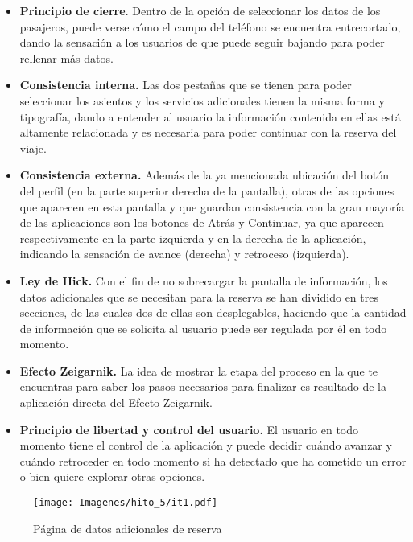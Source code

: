\begin{itemize}
    \item \textbf{Principio de cierre}. Dentro de la opción de seleccionar los datos de los pasajeros, puede verse
        cómo el campo del teléfono se encuentra entrecortado, dando la sensación a los usuarios de que puede seguir
        bajando para poder rellenar más datos.
    \item \textbf{Consistencia interna.} Las dos pestañas que se tienen para poder seleccionar los asientos y los servicios
        adicionales tienen la misma forma y tipografía, dando a entender al usuario la información contenida en
        ellas está altamente relacionada y es necesaria para poder continuar con la reserva del viaje.
    \item \textbf{Consistencia externa.} Además de la ya mencionada ubicación del botón del perfil (en la parte superior
        derecha de la pantalla), otras de las opciones que aparecen en esta pantalla y que guardan consistencia
        con la gran mayoría de las aplicaciones son los botones de Atrás y Continuar, ya que aparecen respectivamente
        en la parte izquierda y en la derecha de la aplicación, indicando la sensación de avance (derecha) y retroceso
        (izquierda).
    \item \textbf{Ley de Hick.} Con el fin de no sobrecargar la pantalla de información, los datos adicionales que se necesitan
        para la reserva se han dividido en tres secciones, de las cuales dos de ellas son desplegables, haciendo que
        la cantidad de información que se solicita al usuario puede ser regulada por él en todo momento.
    \item \textbf{Efecto Zeigarnik.} La idea de mostrar la etapa del proceso en la que te encuentras para saber los pasos
        necesarios para finalizar es resultado de la aplicación directa del Efecto Zeigarnik.
    \item \textbf{Principio de libertad y control del usuario.} El usuario en todo momento tiene el control de la aplicación
        y puede decidir cuándo avanzar y cuándo retroceder en todo momento si ha detectado que ha cometido un error
        o bien quiere explorar otras opciones.
\end{itemize}

\begin{figure}[H]
    \centering
    \texttt{[image: Imagenes/hito\_5/it1.pdf]}
    \caption{Página de datos adicionales de reserva}
    \label{fig:it1_datos_adicionales}
\end{figure}


